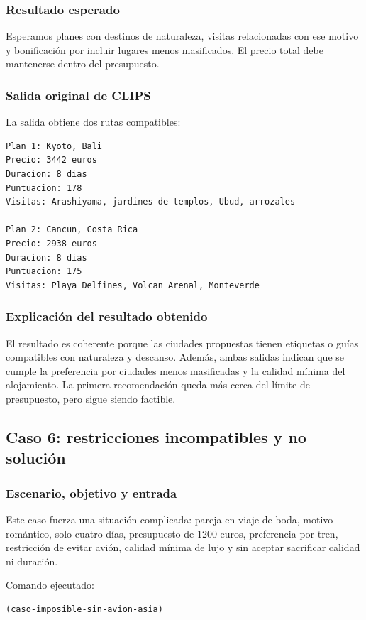 \documentclass[11pt,a4paper]{article}
\begin{document}
\subsubsection{Resultado esperado}
Esperamos planes con destinos de naturaleza, visitas relacionadas con ese
motivo y bonificaci\'on por incluir lugares menos masificados. El precio total
debe mantenerse dentro del presupuesto.

\subsubsection{Salida original de CLIPS}
La salida obtiene dos rutas compatibles:
\begin{verbatim}
Plan 1: Kyoto, Bali
Precio: 3442 euros
Duracion: 8 dias
Puntuacion: 178
Visitas: Arashiyama, jardines de templos, Ubud, arrozales

Plan 2: Cancun, Costa Rica
Precio: 2938 euros
Duracion: 8 dias
Puntuacion: 175
Visitas: Playa Delfines, Volcan Arenal, Monteverde
\end{verbatim}

\subsubsection{Explicaci\'on del resultado obtenido}
El resultado es coherente porque las ciudades propuestas tienen etiquetas o
gu\'ias compatibles con naturaleza y descanso. Adem\'as, ambas salidas indican
que se cumple la preferencia por ciudades menos masificadas y la calidad
m\'inima del alojamiento. La primera recomendaci\'on queda m\'as cerca del l\'imite
de presupuesto, pero sigue siendo factible.

\subsection{Caso 6: restricciones incompatibles y no soluci\'on}
\subsubsection{Escenario, objetivo y entrada}
Este caso fuerza una situaci\'on complicada: pareja en viaje de boda, motivo
rom\'antico, solo cuatro d\'ias, presupuesto de 1200 euros, preferencia por tren,
restricci\'on de evitar avi\'on, calidad m\'inima de lujo y sin aceptar sacrificar
calidad ni duraci\'on.

Comando ejecutado:
\begin{verbatim}
(caso-imposible-sin-avion-asia)
\end{verbatim}
\end{document}
